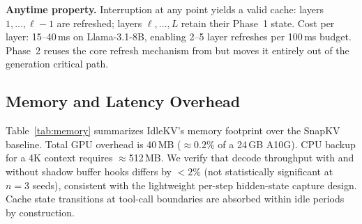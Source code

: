 \documentclass[10pt,twocolumn,letterpaper]{article}
\begin{document}
\textbf{Anytime property.}
Interruption at any point yields a valid cache: layers $1,\ldots,\ell{-}1$
are refreshed; layers $\ell,\ldots,L$ retain their Phase~1 state.
Cost per layer: 15--40\,ms on Llama-3.1-8B, enabling 2--5 layer refreshes per
100\,ms budget.
Phase~2 reuses the core refresh mechanism from \citet{refreshkv2025} but moves
it entirely out of the generation critical path.

\subsection{Memory and Latency Overhead}
\label{sec:overhead}

Table~\ref{tab:memory} summarizes IdleKV's memory footprint over the SnapKV
baseline.
Total GPU overhead is 40\,MB (${\approx}0.2\%$ of a 24\,GB A10G).
CPU backup for a 4K context requires ${\approx}$512\,MB.
We verify that decode throughput with and without shadow buffer hooks differs
by ${<}2\%$ (not statistically significant at $n{=}3$ seeds), consistent with
the lightweight per-step hidden-state capture design.
Cache state transitions at tool-call boundaries are absorbed within idle
periods by construction.

\begin{table}[t]
\centering
\caption{Memory overhead of \textbf{IdleKV} over SnapKV baseline.
GPU overhead is ${\approx}0.2\%$ of a 24\,GB A10G.}
\label{tab:memory}
\end{table}

%
\end{document}
